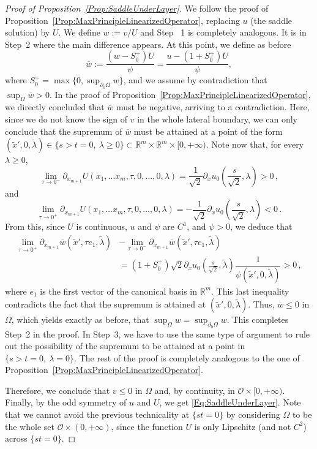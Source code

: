 \documentclass[12pt,reqno]{amsart}
\theoremstyle{definition}
\theoremstyle{remark}
\newcommand{\con}[1]{\mathbb{#1}}
\newcommand{\R}{\con{R}} %
\newcommand{\ocal}{\mathcal{O}}
\numberwithin{equation}{section}
\begin{document}
\begin{proof}[Proof of Proposition~\ref{Prop:SaddleUnderLayer}]
We follow the proof of Proposition~\ref{Prop:MaxPrincipleLinearizedOperator}, replacing $u$ (the saddle solution) by $U$. We define $w:= v/U$ and Step~ 1 is completely analogous. It is in Step~2 where the main difference appears. At this point, we define as before 
$$\overline{w} := \frac{(w - S_0^+)U}{\psi} = \frac{u - (1+S_0^+)U}{\psi},$$
where $S_0^+ = \max \{0, \sup_{\partial_0 \Omega} w\}$, and we assume by contradiction that $\sup_{\Omega} \overline{w}>0$. In the proof of Proposition~\ref{Prop:MaxPrincipleLinearizedOperator}, we directly concluded that $\overline{w}$ must be negative, arriving to a contradiction. Here, since we do not know the sign of $v$ in the whole lateral boundary, we can only conclude that the supremum of $\overline{w}$ must be attained at a point of the form $(\tilde{x}',0, \tilde{\lambda})\in \{s > t= 0,\ \lambda \geq 0\}\subset \R^m \times \R^m \times [0,+\infty)$. Note now that, for every $\lambda \geq 0$,
\begin{equation}
\label{Eq:ULipschitz1}
\lim_{\tau\to 0^-} \partial_{x_{m+1}}  U(x_1,...x_m,\tau,0,...,0,\lambda) = \frac{1}{\sqrt{2}}\partial_xu_0\left(\frac{s}{\sqrt{2}},\lambda\right)>0\,, 
\end{equation}
and
\begin{equation}
\label{Eq:ULipschitz2}
\lim_{\tau\to 0^+} \partial_{x_{m+1}} U(x_1,...x_m,\tau,0,...,0,\lambda) = -\frac{1}{\sqrt{2}}\partial_xu_0\left(\frac{s}{\sqrt{2}},\lambda\right) <0\,.
\end{equation}
From this, since $U$ is continuous, $u$ and $\psi$ are $C^1$, and $\psi > 0$, we deduce that
\begin{align*}
	\lim_{\tau\to 0^+} \partial_{x_{m+1}} \overline{w} (\tilde{x}',\tau e_1,\tilde{\lambda}) &- \lim_{\tau \to 0^-} \partial_{x_{m+1}} \overline{w} (\tilde{x}',\tau e_1,\tilde{\lambda}) \\
	&= (1+S_0^+) \sqrt{2} \partial_xu_0\left(\frac{s}{\sqrt{2}},\tilde{\lambda} \right) \dfrac{1}{\psi(\tilde{x}',0, \tilde{\lambda})}>0\,,  
\end{align*}
where $e_1$ is the first vector of the canonical basis in $\R^{m}$. This last inequality contradicts the fact that the supremum is attained at $(\tilde{x}',0, \tilde{\lambda})$. Thus, $\overline{w}\leq 0$ in $\Omega$, which yields exactly as before,  that $\sup _\Omega w = \sup_{\partial_0 \Omega} w$. This completes Step~2 in the proof. In Step~3, we have to use the same type of argument to rule out the possibility of the supremum to be attained at a point in $\{s > t = 0,\ \lambda = 0\}$. The rest of the proof is completely analogous to the one of Proposition~\ref{Prop:MaxPrincipleLinearizedOperator}.

Therefore, we conclude that $v\leq 0$ in $\Omega$ and, by continuity, in $\ocal\times[0,+\infty)$. Finally, by the odd symmetry of $u$ and $U$, we get \eqref{Eq:SaddleUnderLayer}. Note that we cannot avoid the previous technicality at $\{st=0\}$ by considering $\Omega$ to be the whole set $\ocal \times (0,+\infty)$, since the function $U$ is only Lipschitz (and not $C^2$) across $\{st=0\}$.
\end{proof}
\end{document}

